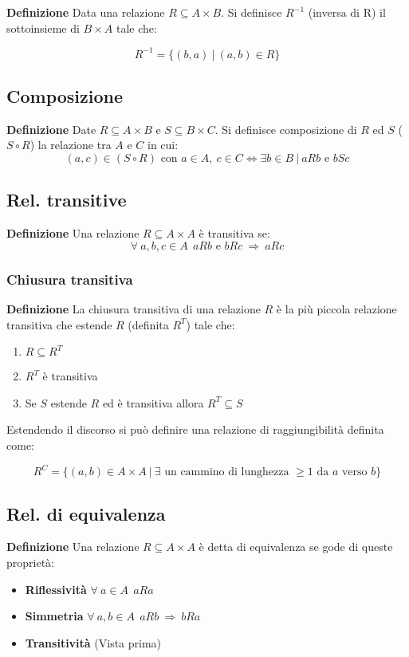 \documentclass{article}
\begin{document}
\textbf{Definizione} Data una relazione $R\subseteq A\times B$. Si definisce $R^{-1}$ (inversa di R) il sottoinsieme di $B\times A$ tale che:

$$R^{-1} = \{(b,a)\ |\ (a,b)\in R\}$$

\subsection{Composizione}

\textbf{Definizione} Date $R\subseteq A \times B$ e $S\subseteq B\times C$. Si definisce composizione di $R$ ed $S$ ($S\circ R$) la relazione tra $A$ e $C$ in cui:
$$(a,c) \in (S\circ R) \text{ con } a\in A,\ c\in C \iff \exists b\in B\ |\ aRb \text{ e } bSc$$

\subsection{Rel. transitive}

\textbf{Definizione} Una relazione $R\subseteq A\times A$ è transitiva se: 
$$\forall \  a,b,c \in A \ \ aRb \text{ e } bRc\ \Rightarrow\  aRc $$

\subsubsection{Chiusura transitiva}

\textbf{Definizione} La chiusura transitiva di una relazione $R$ è la più piccola relazione transitiva che estende $R$ (definita $R^T$) tale che:
\begin{enumerate}
    \item $R\subseteq R^T$
    \item $R^T$ è transitiva
    \item Se $S$ estende $R$ ed è transitiva allora $R^T\subseteq S$\newline
\end{enumerate}

\noindent Estendendo il discorso si può definire una relazione di raggiungibilità definita come:

$$R^C=\{(a,b)\in A\times A \ | \ \exists \text{ un cammino di lunghezza $\geq 1$ da $a$ verso $b$} \}$$

\subsection{Rel. di equivalenza}

\textbf{Definizione} Una relazione $R\subseteq A\times A$ è detta di equivalenza se gode di queste proprietà:
\begin{itemize}
    \item \textbf{Riflessività} $\forall\ a\in A\ \  aRa$
    \item \textbf{Simmetria} $\forall\ a,b\in A\ \ aRb\ \Rightarrow\ bRa$
    \item \textbf{Transitività} (Vista prima)\newline
\end{itemize}
\end{document}
